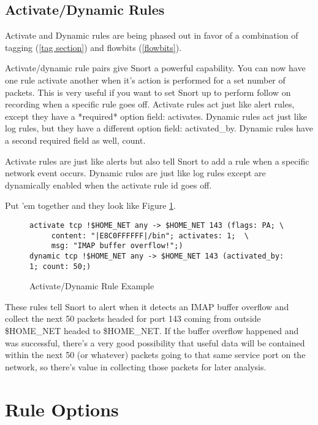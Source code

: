 \documentclass[english]{report}
\newenvironment{note}{
\samepage
    \vspace{10pt}{\textsf{
        {\hspace{7pt}\Huge{$\triangle$\hspace{-12.5pt}{\Large{$^!$}}}}\hspace{5pt}
        {\Large{NOTE}}
    }
    }
   \begin{center}
    \par\vspace{-17pt}

    \begin{lrbox}{\savepar}
    \begin{minipage}[r]{6in}
}
{
    \end{minipage}
    \end{lrbox}
    \fbox{
        \usebox{
            \savepar
        }
    }
    \par\vskip10pt
    \end{center}
}
\begin{document}
\subsection{Activate/Dynamic Rules}

\begin{note}
Activate and Dynamic rules are being phased out in favor of a combination 
of tagging (\ref{tag section}) and flowbits (\ref{flowbits}). 
\end{note}

Activate/dynamic rule pairs give Snort a powerful capability. You
can now have one rule activate another when it's action is performed
for a set number of packets. This is very useful if you want to set
Snort up to perform follow on recording when a specific rule goes
off. Activate rules act just like alert rules, except they
have a {*}required{*} option field: activates.
Dynamic rules act just like log rules, but they have a different option
field: activated\_by. Dynamic rules have a second
required field as well, count. 

Activate rules are just like alerts but also tell Snort to add a rule
when a specific network event occurs. Dynamic rules are just like
log rules except are dynamically enabled when the activate rule id
goes off. 

Put 'em together and they look like Figure \ref{activate/dynamic rule example}.

%
\begin{figure}[!hbpt]
\begin{verbatim}
activate tcp !$HOME_NET any -> $HOME_NET 143 (flags: PA; \
     content: "|E8C0FFFFFF|/bin"; activates: 1;  \
     msg: "IMAP buffer overflow!";)
dynamic tcp !$HOME_NET any -> $HOME_NET 143 (activated_by: 1; count: 50;)
\end{verbatim}

\caption{Activate/Dynamic Rule Example\label{activate/dynamic rule example}}
\end{figure}

These rules tell Snort to alert when it detects an IMAP buffer overflow
and collect the next 50 packets headed for port 143 coming from outside
\$HOME\_NET headed to \$HOME\_NET. If the buffer overflow happened
and was successful, there's a very good possibility that useful data
will be contained within the next 50 (or whatever) packets going to
that same service port on the network, so there's value in collecting
those packets for later analysis.

\newpage
\section{Rule Options}
\end{document}
